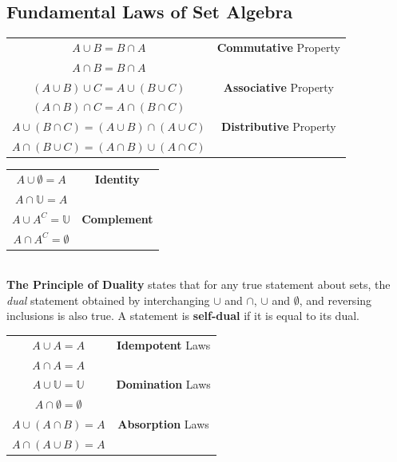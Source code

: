 \documentclass{article}
\begin{document}
        \subsection{Fundamental Laws of Set Algebra}
            \begin{center}
                \begin{tabular}{|c|c|}
                    \hline
                    $A\cup B=B \cap A$ & \textbf{Commutative} Property \\
                    $A\cap B = B\cap A$ & \\ \hline
                    $(A\cup B)\cup C = A\cup (B\cup C)$ & \textbf{Associative} Property \\
                    $(A\cap B)\cap C = A\cap (B\cap C)$ & \\ \hline
                    $A\cup (B \cap C) = (A\cup B) \cap (A\cup C)$ & \textbf{Distributive} Property \\
                    $A\cap (B \cup C) = (A\cap B) \cup (A\cap C)$ & \\ \hline
                \end{tabular}

                \begin{tabular}{|c|c|}
                    \hline
                    $A \cup \emptyset = A$ & \textbf{Identity} \\
                    $A \cap \mathbb{U}=A$ & \\ \hline
                    $A \cup A^C = \mathbb{U}$ & \textbf{Complement} \\
                    $A \cap A^C = \emptyset$ & \\ \hline
                \end{tabular}
            \end{center}\\

            \noindent \color{purple} \textbf{The Principle of Duality} \color{black} states that
            for any true statement about sets, the \textit{dual }statement obtained by interchanging
            $\cup$ and $\cap$, $\cup$ and $\emptyset$, and reversing inclusions is also true. A
            statement is \textbf{self-dual} if it is equal to its dual. \\

            \begin{center}
                \begin{tabular}{|c|c|}
                    \hline
                    $A\cup A=A$ & \textbf{Idempotent} Laws \\
                    $A \cap A = A$ & \\ \hline
                    $A\cup \mathbb{U}=\mathbb{U}$ & \textbf{Domination} Laws\\
                    $A\cap \emptyset = \emptyset$ & \\ \hline
                    $A\cup (A \cap B) = A$  & \textbf{Absorption} Laws \\
                    $A\cap (A \cup B) = A$ & \\ \hline
                \end{tabular}
            \end{center}
\end{document}
